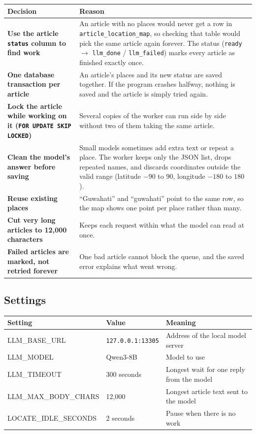 \documentclass[11pt,a4paper]{article}
\newcommand{\head}[1]{\textbf{#1}}
\newcommand{\code}[1]{\texttt{#1}}
\begin{document}
\begin{tabularx}{\textwidth}{>{\bfseries}p{5.2cm} L}
\toprule
{} \head{Decision} & \head{Reason} \\
\midrule
Use the article \code{status} column to find work & An article with no places would never get a row in \code{article\_location\_map}, so checking that table would pick the same article again forever. The status (\code{ready} $\rightarrow$ \code{llm\_done} / \code{llm\_failed}) marks every article as finished exactly once. \\
One database transaction per article & An article's places and its new status are saved together. If the program crashes halfway, nothing is saved and the article is simply tried again. \\
Lock the article while working on it (\code{FOR UPDATE SKIP LOCKED}) & Several copies of the worker can run side by side without two of them taking the same article. \\
Clean the model's answer before saving & Small models sometimes add extra text or repeat a place. The worker keeps only the JSON list, drops repeated names, and discards coordinates outside the valid range (latitude $-90$ to $90$, longitude $-180$ to $180$). \\
Reuse existing places & ``Guwahati'' and ``guwahati'' point to the same row, so the map shows one point per place rather than many. \\
Cut very long articles to 12{,}000 characters & Keeps each request within what the model can read at once. \\
Failed articles are marked, not retried forever & One bad article cannot block the queue, and the saved error explains what went wrong. \\
\bottomrule
\end{tabularx}

\subsection{Settings}

\begin{tabularx}{\textwidth}{>{\ttfamily}p{4.5cm} p{3cm} L}
\toprule
{} \head{\sffamily Setting} & \head{Value} & \head{Meaning} \\
\midrule
LLM\_BASE\_URL & \code{127.0.0.1:13305} & Address of the local model server \\
LLM\_MODEL & Qwen3-8B & Model to use \\
LLM\_TIMEOUT & 300 seconds & Longest wait for one reply from the model \\
LLM\_MAX\_BODY\_CHARS & 12{,}000 & Longest article text sent to the model \\
LOCATE\_IDLE\_SECONDS & 2 seconds & Pause when there is no work \\
\bottomrule
\end{tabularx}
\end{document}
